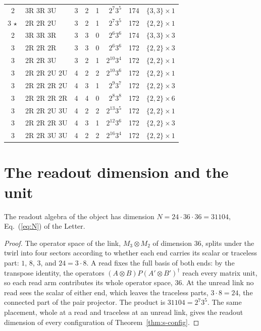 \begin{table}[h]
\begin{ruledtabular}
\begin{tabular}{clcccrrl}
2 & 3R 3R 3U & 3 & 2 & 1 & $2^{7}3^{5}$ & 174 & $\{3,3\}\times 1$ \\
$3\,\star$ & 2R 2R 2U & 3 & 2 & 1 & $2^{7}3^{5}$ & 172 & $\{2,2\}\times 1$ \\
2 & 3R 3R 3R & 3 & 3 & 0 & $2^{6}3^{6}$ & 174 & $\{3,3\}\times 3$ \\
3 & 2R 2R 2R & 3 & 3 & 0 & $2^{6}3^{6}$ & 172 & $\{2,2\}\times 3$ \\
3 & 2R 2R 3U & 3 & 2 & 1 & $2^{10}3^{4}$ & 172 & $\{2,2\}\times 1$ \\
3 & 2R 2R 2U 2U & 4 & 2 & 2 & $2^{10}3^{6}$ & 172 & $\{2,2\}\times 1$ \\
3 & 2R 2R 2R 2U & 4 & 3 & 1 & $2^{9}3^{7}$ & 172 & $\{2,2\}\times 3$ \\
3 & 2R 2R 2R 2R & 4 & 4 & 0 & $2^{8}3^{8}$ & 172 & $\{2,2\}\times 6$ \\
3 & 2R 2R 2U 3U & 4 & 2 & 2 & $2^{13}3^{5}$ & 172 & $\{2,2\}\times 1$ \\
3 & 2R 2R 2R 3U & 4 & 3 & 1 & $2^{12}3^{6}$ & 172 & $\{2,2\}\times 3$ \\
3 & 2R 2R 3U 3U & 4 & 2 & 2 & $2^{16}3^{4}$ & 172 & $\{2,2\}\times 1$ \\
\end{tabular}
\end{ruledtabular}
\end{table}

\section{The readout dimension and the unit}
\label{sec:s-register}

\begin{lemma}
\label{lem:s-register}
The readout algebra of the object has dimension $N=24\cdot 36\cdot 36=31104$, Eq.~(\ref{eq:N}) of the Letter.
\end{lemma}
\begin{proof}
The operator space of the link, $M_{3}\otimes M_{2}$ of dimension $36$, splits under the twirl into four sectors according to whether each end carries its scalar or traceless part: $1$, $8$, $3$, and $24=3\cdot 8$. A read fixes the full basis of both ends: by the transpose identity, the operators $(A\otimes B)P(A'\otimes B')^{\dagger}$ reach every matrix unit, so each read arm contributes its whole operator space, $36$. At the unread link no read sees the scalar of either end, which leaves the traceless parts, $3\cdot 8=24$, the connected part of the pair projector. The product is $31104=2^{7}3^{5}$. The same placement, whole at a read and traceless at an unread link, gives the readout dimension of every configuration of Theorem~\ref{thm:s-config}.
\end{proof}


